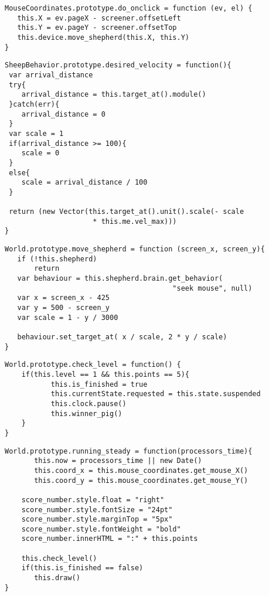 \begin{lstlisting}[caption=Función do onclick]
 MouseCoordinates.prototype.do_onclick = function (ev, el) {
   this.X = ev.pageX - screener.offsetLeft
   this.Y = ev.pageY - screener.offsetTop
   this.device.move_shepherd(this.X, this.Y)
}
\end{lstlisting}

\begin{lstlisting}[caption=Función desired velocity]
SheepBehavior.prototype.desired_velocity = function(){
 var arrival_distance
 try{
    arrival_distance = this.target_at().module()
 }catch(err){
    arrival_distance = 0
 }
 var scale = 1
 if(arrival_distance >= 100){
    scale = 0
 }
 else{
    scale = arrival_distance / 100
 }

 return (new Vector(this.target_at().unit().scale(- scale 
                     * this.me.vel_max)))
}
\end{lstlisting}


\begin{lstlisting}[caption=Función move shepherd]
World.prototype.move_shepherd = function (screen_x, screen_y){
   if (!this.shepherd)
       return
   var behaviour = this.shepherd.brain.get_behavior(
                                        "seek mouse", null)
   var x = screen_x - 425
   var y = 500 - screen_y
   var scale = 1 - y / 3000

   behaviour.set_target_at( x / scale, 2 * y / scale)
}
\end{lstlisting}


\begin{lstlisting}[caption=Función check level]
World.prototype.check_level = function() {
    if(this.level == 1 && this.points == 5){
           this.is_finished = true
           this.currentState.requested = this.state.suspended
           this.clock.pause()
           this.winner_pig()
    }
}
\end{lstlisting}


\begin{lstlisting}[caption=Función running steady]
World.prototype.running_steady = function(processors_time){
       this.now = processors_time || new Date()
       this.coord_x = this.mouse_coordinates.get_mouse_X()
       this.coord_y = this.mouse_coordinates.get_mouse_Y()

    score_number.style.float = "right"
    score_number.style.fontSize = "24pt"
    score_number.style.marginTop = "5px"
    score_number.style.fontWeight = "bold"
    score_number.innerHTML = ":" + this.points

    this.check_level()
    if(this.is_finished == false)
       this.draw()
}
\end{lstlisting}



